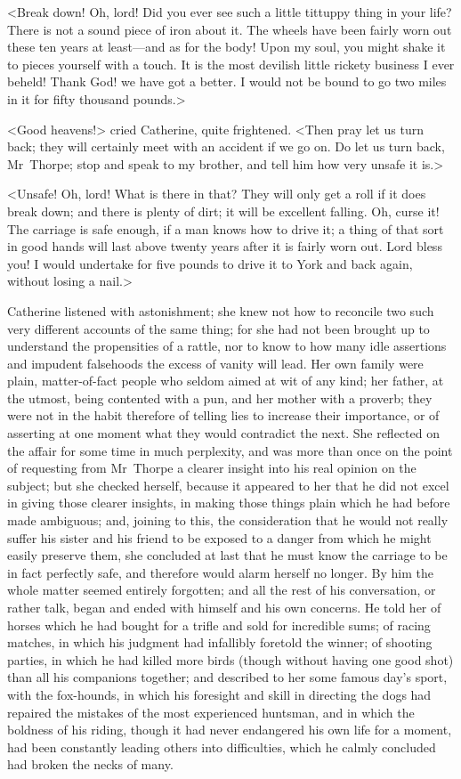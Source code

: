  <Break down! Oh, lord! Did you ever see such a little tittuppy thing in your life? There is not a sound piece of iron about it. The wheels have been fairly worn out these ten years at least—and as for the body! Upon my soul, you might shake it to pieces yourself with a touch. It is the most devilish little rickety business I ever beheld! Thank God! we have got a better. I would not be bound to go two miles in it for fifty thousand pounds.> 

 <Good heavens!> cried Catherine, quite frightened. <Then pray let us turn back; they will certainly meet with an accident if we go on. Do let us turn back, Mr~Thorpe; stop and speak to my brother, and tell him how very unsafe it is.> 

 <Unsafe! Oh, lord! What is there in that? They will only get a roll if it does break down; and there is plenty of dirt; it will be excellent falling. Oh, curse it! The carriage is safe enough, if a man knows how to drive it; a thing of that sort in good hands will last above twenty years after it is fairly worn out. Lord bless you! I would undertake for five pounds to drive it to York and back again, without losing a nail.> 

 Catherine listened with astonishment; she knew not how to reconcile two such very different accounts of the same thing; for she had not been brought up to understand the propensities of a rattle, nor to know to how many idle assertions and impudent falsehoods the excess of vanity will lead. Her own family were plain, matter-of-fact people who seldom aimed at wit of any kind; her father, at the utmost, being contented with a pun, and her mother with a proverb; they were not in the habit therefore of telling lies to increase their importance, or of asserting at one moment what they would contradict the next. She reflected on the affair for some time in much perplexity, and was more than once on the point of requesting from Mr~Thorpe a clearer insight into his real opinion on the subject; but she checked herself, because it appeared to her that he did not excel in giving those clearer insights, in making those things plain which he had before made ambiguous; and, joining to this, the consideration that he would not really suffer his sister and his friend to be exposed to a danger from which he might easily preserve them, she concluded at last that he must know the carriage to be in fact perfectly safe, and therefore would alarm herself no longer. By him the whole matter seemed entirely forgotten; and all the rest of his conversation, or rather talk, began and ended with himself and his own concerns. He told her of horses which he had bought for a trifle and sold for incredible sums; of racing matches, in which his judgment had infallibly foretold the winner; of shooting parties, in which he had killed more birds (though without having one good shot) than all his companions together; and described to her some famous day's sport, with the fox-hounds, in which his foresight and skill in directing the dogs had repaired the mistakes of the most experienced huntsman, and in which the boldness of his riding, though it had never endangered his own life for a moment, had been constantly leading others into difficulties, which he calmly concluded had broken the necks of many. 

